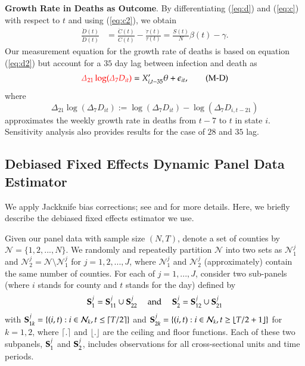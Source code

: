 \documentclass[9pt,twoside,lineno]{pnas-new}
\theoremstyle{definition}
\def\ycolor{\color{red}}
\begin{document}
\textbf{Growth Rate in Deaths as Outcome}. By differentiating (\ref{eq:d}) and (\ref{eq:c}) with respect to $t$ and using (\ref{eq:c2}), we obtain
\begin{align}
\frac{\ddot{D}(t) }{\dot D(t)}& = \frac{\ddot{C}(t) }{\dot C(t)}  - \frac{\dot{\tau}(t) }{ \tau(t)}    =  \frac{S(t)}{N}\beta(t)  -   \gamma.\label{eq:d2}
\end{align}
Our measurement equation for the growth rate of deaths is based on equation (\ref{eq:d2}) but   account for a $35$ day lag between infection and death as
\begin{align}
{\ycolor \Delta_{21} \log(\Delta_7 D_{it})}  = X_{i,t-35}' \theta + \epsilon_{it},\label{eq:M-D} \tag{M-D}
\end{align}
where
\begin{equation} \label{eq:y-d}
 \Delta_{21} \log(\Delta_7 D_{it}):= \log( \Delta_7 D_{it} ) -
\log( \Delta_7 D_{i,t-21})
\end{equation}
approximates the weekly growth rate in deaths from $t-7$ to $t$ in state $i$.  Sensitivity analysis also provides
results for the case of $28$ and $35$ lag.

\subsection*{Debiased Fixed Effects Dynamic Panel Data Estimator}
We apply Jackknife bias corrections;  see \cite{chen2020}  and  \cite{HahnNewey2004} for more details. Here, we briefly describe the debiased fixed effects estimator we use.


Given our panel data with sample size $(N,T)$, denote a set of counties by $\mathcal{N}=\{1,2,...,N\}$.  We randomly and repeatedly partition $\mathcal{N}$ into two sets as $\mathcal{N}_1^j$ and $\mathcal{N}_2^j=\mathcal{N}\setminus \mathcal{N}_1^j$ for $j=1,2,...,J$, where $\mathcal{N}_1^j$ and $\mathcal{N}_2^j$ (approximately) contain the same number of counties.  For each of $j=1,...,J$, consider two sub-panels 
(where $i$ stands for county and $t$ stands for the day)  defined by
$${\bf S}_1^j = {\bf S}_{11}^j  \cup {\bf S}_{22}^j\quad \text{ and }\quad {\bf S}_2^j  = {\bf S}_{12} ^j \cup {\bf S}_{21}^j $$ with ${\bf S}_{1k} ^j=  \{(i,t) :  i \in \mathcal{N}_k,  t \leq \lceil T/2 \rceil \}$ and 
${\bf S}_{2k} ^j=  \{(i,t) :  i \in \mathcal{N}_k,  t  \geq \lfloor T/2 + 1\rfloor\}$ for $k=1,2$, where $\lceil . \rceil$  and  $\lfloor . \rfloor$ are the ceiling and floor functions.  Each of these two subpanels, ${\bf S}_1^j$ and ${\bf S}_2^j$,  includes observations for all cross-sectional units and time periods. 
 
\end{document}
